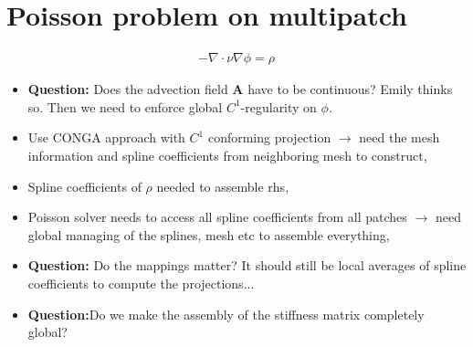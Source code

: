 \documentclass[presentation.tex]{subfiles}
\begin{document}
\section{Poisson problem on multipatch}
\begin{align*}
    -\nabla \cdot \nu \nabla \phi = \rho
\end{align*}
\begin{itemize}
    \item \textbf{Question:} Does the advection field $\mathbf{A}$ have to be
            continuous? Emily thinks so. Then we need to enforce global $C^1$-regularity on $\phi$.
    \item Use CONGA approach with $C^1$ conforming projection $\rightarrow$ 
            need the mesh information and spline coefficients from neighboring mesh
            to construct,
    \item Spline coefficients of $\rho$ needed to assemble rhs,
    \item Poisson solver needs to access all spline coefficients from all patches
            $\rightarrow$ need global managing of the splines, mesh etc 
            to assemble everything,
    \item \textbf{Question:} Do the mappings matter? It should still be local 
            averages of spline coefficients to compute the projections...
    \item \textbf{Question:}Do we make the assembly of the stiffness matrix completely global?
\end{itemize}
\end{document}
